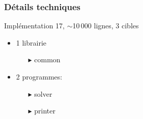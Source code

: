 \documentclass[11pt]{beamer}
\begin{document}
		\begin{frame}
			\frametitle{Détails techniques}
			\begin{center}
				\begin{minipage}[b]{0.47\textwidth}
					\begin{block}{Implémentation}
						\Cpp{}17, $\sim$10\,000 lignes, 3 cibles
						\begin{itemize}
							\item 1 librairie
								\begin{itemize}
									\item[\(\blacktriangleright\)] common
								\end{itemize}
							\item 2 programmes:
								\begin{itemize}
									\item[\(\blacktriangleright\)] solver
									\item[\(\blacktriangleright\)] printer
								\end{itemize}
						\end{itemize}
					\end{block}
				\end{minipage}
				\hfill{}
			\end{center}
		\end{frame}
\end{document}
